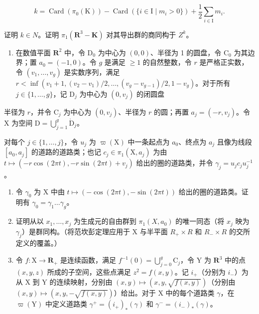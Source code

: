 \[
k = \operatorname{Card} (\pi_ {0} (\mathrm{K})) - \operatorname{Card} (\{i \in \mathrm{I} \mid m _ {i} > 0 \}) + \frac {1}{2} \sum_ {i \in \mathrm{I}} m _ {i}.
\]

   证明 \(k \in N\)。证明 \(\pi_{1}(\mathbf{R}^{3} - \mathbf{K})\) 对其导出群的商同构于 \(Z^{k}\)。

\begin{enumerate}
\def\labelenumi{\arabic{enumi})}
\setcounter{enumi}{25}
\tightlist
\item
  在数值平面 \(\mathbf{R}^2\) 中，令 \(\mathrm{D}_0\) 为中心为 \((0,0)\)、半径为 1 的圆盘，令 \(\mathrm{C}_0\) 为其边界；置 \(a_0 = (-1,0)\)。令 \(g\) 是满足 \(\geqslant 1\) 的自然整数，令 \(r\) 是严格正实数，令 \((v_1,\ldots,v_g)\) 是实数序列，满足 \(r < \inf (v_{1} + 1,(v_{2} - v_{1}) / 2,\dots,(v_{g} - v_{g - 1}) / 2,1 - v_{g})\)。对于所有 \(j\in \{1,\ldots,g\}\)，记 \(\mathrm{D}_j\) 为中心为 \((0,v_j)\) 的闭圆盘
\end{enumerate}

半径为 \(r\)，并令 \(\mathrm{C}_j\) 为中心为 \((0,v_j)\)、半径为 \(r\) 的圆；再置 \(a_{j}=(-r,v_{j})\)。令 X 为空间 \(\mathrm{D}=\bigcup_{j=1}^{g}\mathring{\mathrm{D}}_{j}\)。

  对每个 \(j \in \{1, \ldots, j\}\)，令 \(u_j\) 为 \(\varpi(\mathrm{X})\) 中一条起点为 \(a_0\)、终点为 \(a_j\) 且像为线段 \([a_0, a_j]\) 的道路的道路类；也记 \(c_j \in \pi_1(\mathrm{X}, a_j)\) 为由 \(t \mapsto (-r \cos(2\pi t), -r \sin(2\pi t) + v_j)\) 给出的圈的道路类，并令 \(\gamma_j = u_j c_j u_j^{-1}\)。

\begin{enumerate}
\def\labelenumi{\alph{enumi})}
\item
  令 \(\gamma_{0}\) 为 X 中由 \(t \mapsto (-\cos(2\pi t), -\sin(2\pi t))\) 给出的圈的道路类。证明有 \(\gamma_{0} = \gamma_{1} \ldots \gamma_{g}\)。
\item
  证明从以 \(x_{1},\ldots,x_{j}\) 为生成元的自由群到 \(\pi_{1}(X,a_{0})\) 的唯一同态（将 \(x_{j}\) 映为 \(\gamma_{j}\)）是群同构。（将范坎彭定理应用于 X 与半平面 \(R_{+}\times R\) 和 \(R_{-}\times R\) 的交所定义的覆盖。）
\item
  令 \(f \colon \mathrm{X} \to \mathbf{R}_+\) 是连续函数，满足 \(f^{-1}(0) = \bigcup_{j=0}^{g} \mathrm{C}_j\)，令 Y 为 \(\mathbf{R}^3\) 中的点 \((x, y, z)\) 所成的子空间，这些点满足 \(z^2 = f(x, y)\)。记 \(i_+\)（分别为 \(i_-\)）为从 X 到 Y 的连续映射，分别由 \((x, y) \mapsto (x, y, \sqrt{f(x, y)})\)（分别由 \((x, y) \mapsto (x, y, -\sqrt{f(x, y)})\)）给出。对于 X 中的每个道路类 \(\gamma\)，在 \(\varpi(\mathrm{Y})\) 中定义道路类 \(\gamma^+ = (i_+)_{*}(\gamma)\) 和 \(\gamma^- = (i_-)_*(\gamma)\)。
\end{enumerate}

